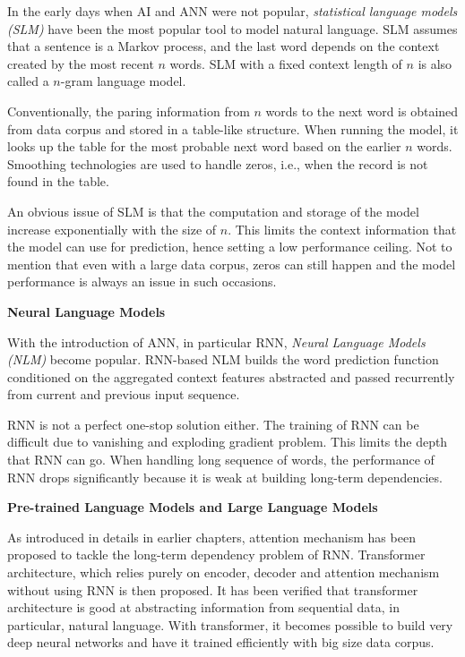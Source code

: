 In the early days when AI and ANN were not popular, \textit{statistical language models (SLM)} have been the most popular tool to model natural language. SLM assumes that a sentence is a Markov process, and the last word depends on the context created by the most recent $n$ words. SLM with a fixed context length of $n$ is also called a $n$-gram language model.

Conventionally, the paring information from $n$ words to the next word is obtained from data corpus and stored in a table-like structure. When running the model, it looks up the table for the most probable next word based on the earlier $n$ words. Smoothing technologies are used to handle zeros, i.e., when the record is not found in the table.

An obvious issue of SLM is that the computation and storage of the model increase exponentially with the size of $n$. This limits the context information that the model can use for prediction, hence setting a low performance ceiling. Not to mention that even with a large data corpus, zeros can still happen and the model performance is always an issue in such occasions.

\vspace{0.1in}
\noindent \textbf{Neural Language Models}
\vspace{0.1in}

With the introduction of ANN, in particular RNN, \textit{Neural Language Models (NLM)} become popular. RNN-based NLM builds the word prediction function conditioned on the aggregated context features abstracted and passed recurrently from current and previous input sequence.

RNN is not a perfect one-stop solution either. The training of RNN can be difficult due to vanishing and exploding gradient problem. This limits the depth that RNN can go. When handling long sequence of words, the performance of RNN drops significantly because it is weak at building long-term dependencies.

\vspace{0.1in}
\noindent \textbf{Pre-trained Language Models and Large Language Models}
\vspace{0.1in}

As introduced in details in earlier chapters, attention mechanism has been proposed to tackle the long-term dependency problem of RNN. Transformer architecture, which relies purely on encoder, decoder and attention mechanism without using RNN is then proposed. It has been verified that transformer architecture is good at abstracting information from sequential data, in particular, natural language. With transformer, it becomes possible to build very deep neural networks and have it trained efficiently with big size data corpus.


